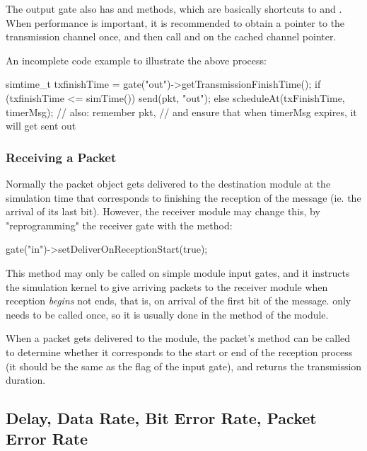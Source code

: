 The output gate also has  and 
methods, which are basically shortcuts to 
and . When performance
is important, it is recommended to obtain a pointer to the transmission
channel once, and then call  and 
on the cached channel pointer.

An incomplete code example to illustrate the above process:

\begin{cpp}
simtime_t txfinishTime = gate("out")->getTransmissionFinishTime();
if (txfinishTime <= simTime())
    send(pkt, "out");
else
    scheduleAt(txFinishTime, timerMsg); // also: remember pkt,
    // and ensure that when timerMsg expires, it will get sent out
\end{cpp}


\subsubsection{Receiving a Packet}

Normally the packet object gets delivered to the destination module
at the simulation time that corresponds to finishing the reception
of the message (ie. the arrival of its last bit). However, the receiver
module may change this, by "reprogramming" the receiver gate with
the  method:

\begin{cpp}
gate("in")->setDeliverOnReceptionStart(true);
\end{cpp}

This method may only be called on simple module input gates, and it
instructs the simulation kernel to give arriving packets to the
receiver module when reception \textit{begins} not ends, that is,
on arrival of the first bit of the message.
 only needs to be called once,
so it is usually done in the  method of the module.

When a packet gets delivered to the module, the packet's
 method can be called to determine
whether it corresponds to the start or end of the reception
process (it should be the same as the 
flag of the input gate), and  returns the transmission
duration.


\subsection{Delay, Data Rate, Bit Error Rate, Packet Error Rate}

